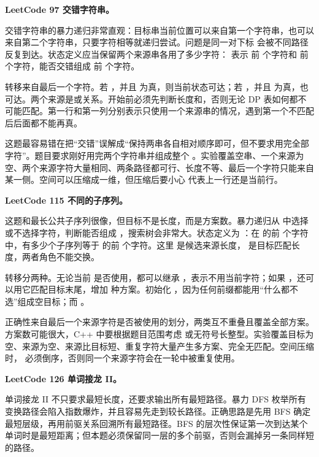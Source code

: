 \noindent\textbf{LeetCode 97 交错字符串。}

交错字符串的暴力递归非常直观：目标串当前位置可以来自第一个字符串，也可以来自第二个字符串，只要字符相等就递归尝试。问题是同一对下标  会被不同路径反复到达。状态定义应当保留两个来源串各用了多少字符： 表示  前  个字符和  前  个字符，能否交错组成  前  个字符。

转移来自最后一个字符。若 ，并且  为真，则当前状态可达；若 ，并且  为真，也可达。两个来源是或关系。开始前必须先判断长度和，否则无论 DP 表如何都不可能匹配。第一行和第一列分别表示只使用一个来源串的情况，遇到第一个不匹配后后面都不能再真。

这题最容易错在把“交错”误解成“保持两串各自相对顺序即可，但不要求用完全部字符”。题目要求刚好用完两个字符串并组成整个 。实验覆盖空串、一个来源为空、两个来源字符大量相同、两条路径都可行、长度不等、最后一个字符只能来自某一侧。空间可以压缩成一维，但压缩后要小心  代表上一行还是当前行。

\noindent\textbf{LeetCode 115 不同的子序列。}

这题和最长公共子序列很像，但目标不是长度，而是方案数。暴力递归从  中选择或不选择字符，判断能否组成 ，搜索树会非常大。状态定义为 ：在  的前  个字符中，有多少个子序列等于  的前  个字符。这里  是候选来源长度， 是目标匹配长度，两者角色不能交换。

转移分两种。无论当前  是否使用，都可以继承 ，表示不用当前字符；如果 ，还可以用它匹配目标末尾，增加  种方案。初始化 ，因为任何前缀都能用“什么都不选”组成空目标；而 。

正确性来自最后一个来源字符是否被使用的划分，两类互不重叠且覆盖全部方案。方案数可能很大，C++ 中要根据题目范围考虑  或无符号长整型。实验覆盖目标为空、来源为空、来源比目标短、重复字符大量产生多方案、完全无匹配。空间压缩时， 必须倒序，否则同一个来源字符会在一轮中被重复使用。

\noindent\textbf{LeetCode 126 单词接龙 II。}

单词接龙 II 不只要求最短长度，还要求输出所有最短路径。暴力 DFS 枚举所有变换路径会陷入指数爆炸，并且容易先走到较长路径。正确思路是先用 BFS 确定最短层级，再用前驱关系回溯所有最短路径。BFS 的层次性保证第一次到达某个单词时是最短距离；但本题必须保留同一层的多个前驱，否则会漏掉另一条同样短的路径。

